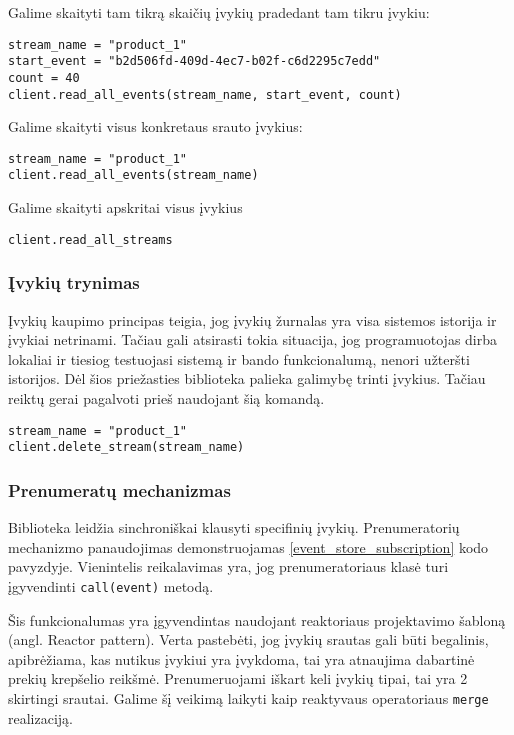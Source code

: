 Galime skaityti tam tikrą skaičių įvykių pradedant tam tikru įvykiu:

\begin{lstlisting}[]
stream_name = "product_1" 
start_event = "b2d506fd-409d-4ec7-b02f-c6d2295c7edd"
count = 40
client.read_all_events(stream_name, start_event, count)
\end{lstlisting}

Galime skaityti visus konkretaus srauto įvykius:

\begin{lstlisting}[]
stream_name = "product_1" 
client.read_all_events(stream_name)
\end{lstlisting}

Galime skaityti apskritai visus įvykius

\begin{lstlisting}[]
client.read_all_streams
\end{lstlisting}

\subsubsection{Įvykių trynimas}

Įvykių kaupimo principas teigia, jog įvykių žurnalas yra visa sistemos istorija ir įvykiai netrinami. Tačiau gali atsirasti tokia situacija, jog programuotojas dirba lokaliai ir tiesiog testuojasi sistemą ir bando funkcionalumą, nenori užteršti istorijos. Dėl šios priežasties biblioteka palieka galimybę trinti įvykius. Tačiau reiktų gerai pagalvoti prieš naudojant šią komandą.

\begin{lstlisting}
stream_name = "product_1"
client.delete_stream(stream_name)
\end{lstlisting}

\subsubsection{Prenumeratų mechanizmas}

Biblioteka leidžia sinchroniškai klausyti specifinių įvykių. Prenumeratorių mechanizmo panaudojimas demonstruojamas \ref{event_store_subscription} kodo pavyzdyje. Vienintelis reikalavimas yra, jog prenumeratoriaus klasė turi įgyvendinti \lstinline|call(event)| metodą.

Šis funkcionalumas yra įgyvendintas naudojant reaktoriaus projektavimo šabloną (angl. Reactor pattern). Verta pastebėti, jog įvykių srautas gali būti begalinis, apibrėžiama, kas nutikus įvykiui yra įvykdoma, tai yra atnaujima dabartinė prekių krepšelio reikšmė. Prenumeruojami iškart keli įvykių tipai, tai yra 2 skirtingi srautai. Galime šį veikimą laikyti kaip reaktyvaus operatoriaus \lstinline|merge| realizaciją.

